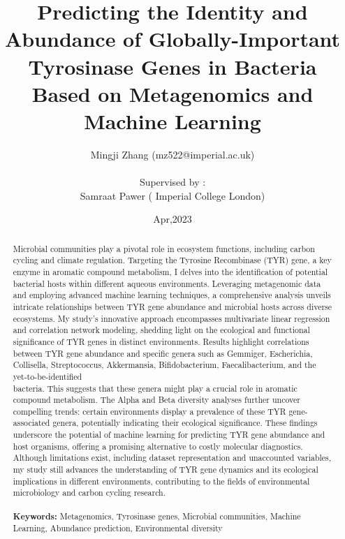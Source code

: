 \documentclass[12pt]{article}
\title{Predicting the Identity and Abundance of Globally-Important Tyrosinase Genes in Bacteria Based on Metagenomics and Machine Learning}
\author{Mingji Zhang (mz522@imperial.ac.uk)\\\\
Supervised by :\\
Samraat Pawer ( Imperial College London)}
\date{Apr,2023}
\begin{document}
\maketitle
\newpage
\tableofcontents
\newpage
{} 
\setcounter{page}{1} 
\maketitle

\begin{abstract}

Microbial communities play a pivotal role in ecosystem functions, including carbon cycling and climate regulation. Targeting the Tyrosine Recombinase (TYR) gene, a key enzyme in aromatic compound metabolism, I delves into the identification of potential bacterial hosts within different aqueous environments. Leveraging metagenomic data and employing advanced machine learning techniques, a comprehensive analysis unveils intricate relationships between TYR gene abundance and microbial hosts across diverse ecosystems. My study's innovative approach encompasses multivariate linear regression and correlation network modeling, shedding light on the ecological and functional significance of TYR genes in distinct environments. Results highlight correlations between TYR gene abundance and specific genera such as Gemmiger, Escherichia, Collisella, Streptococcus, Akkermansia, Bifidobacterium, Faecalibacterium, and the yet-to-be-identified \\
 bacteria. This suggests that these genera might play a crucial role in aromatic compound metabolism. The Alpha and Beta diversity analyses further uncover compelling trends: certain environments display a prevalence of these TYR gene-associated genera, potentially indicating their ecological significance. These findings underscore the potential of machine learning for predicting TYR gene abundance and host organisms, offering a promising alternative to costly molecular diagnostics.  Although limitations exist, including dataset representation and unaccounted variables, my study still advances the understanding of TYR gene dynamics and its ecological implications in different environments, contributing to the fields of environmental microbiology and carbon cycling research.\\\\

\textbf{Keywords:} Metagenomics, Tyrosinase genes, Microbial communities, Machine Learning, Abundance prediction, Environmental diversity
\end{abstract}
\restoregeometry
\end{document}
